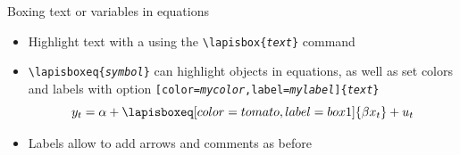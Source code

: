 \documentclass[10pt,itemsep]{beamer}
\begin{document}
\begin{frame}
    {Boxing text or variables in equations}
    \begin{itemize}
        \item Highlight text with a  using the \texttt{\textbackslash lapisbox\{\textit{text}\}} command\bigskip\medskip
        \pause
        \item \texttt{\textbackslash lapisboxeq\{\textit{symbol}\}} can highlight objects in equations, as well as set colors and labels with option \texttt{[color=\textit{mycolor},label=\textit{mylabel}]\{\textit{text}\}}
        \begin{equation*}
            y_{t} = \alpha + \lapisboxeq[color=tomato,label=box1]{\beta x_t} + u_{t} \vspace{-.3cm}
        \end{equation*}
        \pause
        \item Labels allow to add arrows and comments as before
    \end{itemize}
\end{frame} 
\shownotesblock{}
\end{document}
